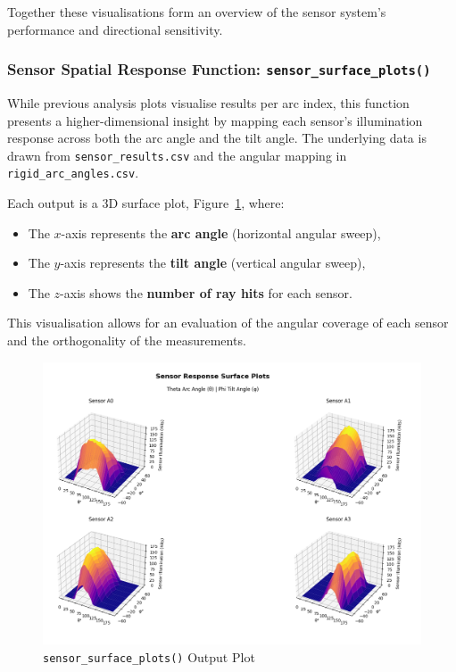 \vspace{1em}
Together these visualisations form an overview of the sensor system's performance and directional sensitivity. 

\subsubsection{Sensor Spatial Response Function: \texttt{sensor\_surface\_plots()}}
While previous analysis plots visualise results per arc index, this function presents a higher-dimensional insight by mapping each sensor’s illumination response across both the arc angle and the tilt angle. The underlying data is drawn from \texttt{sensor\_results.csv} and the angular mapping in \texttt{rigid\_arc\_angles.csv}.

Each output is a 3D surface plot, Figure~\ref{fig:Sensor Surface Output Plot}, where:
\begin{itemize}
    \item The $x$-axis represents the \textbf{arc angle} (horizontal angular sweep),
    \item The $y$-axis represents the \textbf{tilt angle} (vertical angular sweep),
    \item The $z$-axis shows the \textbf{number of ray hits} for each sensor.
\end{itemize}
This visualisation allows for an evaluation of the angular coverage of each sensor and the orthogonality of the measurements.
\begin{landscape}
    \begin{figure}[p] %
        \centering
        \includegraphics[width=1.3\textwidth]{chapters/methodology/SoftwareModel/images/Sensor Surface Plots.png} %
        \caption{\texttt{sensor\_surface\_plots()} Output Plot}       %
        \label{fig:Sensor Surface Output Plot}            %
    \end{figure}
\end{landscape}

